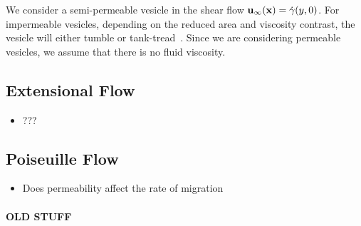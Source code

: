 \documentclass[aps,prl,showpacs]{revtex4}
\newif\ifTikz
\begin{document}
We consider a semi-permeable vesicle in the shear flow
$\mathbf{u}_{\infty}(\mathbf{x}) = \dot{\gamma} (y,0)$. For impermeable vesicles,
depending on the reduced area and viscosity contrast, the vesicle will
either tumble or tank-tread~\cite{fin-lam-sei-gom2008}. Since we are
considering permeable vesicles, we assume that there is no fluid
viscosity. 


 

\subsection{Extensional Flow}
\begin{itemize}
  \item ???
\end{itemize}

\ifTikz

\fi

\subsection{Poiseuille Flow}
\begin{itemize}
  \item Does permeability affect the rate of migration
\end{itemize}



 
 




 \newpage
 \paragraph{\bf \Huge OLD STUFF}

\end{document}

